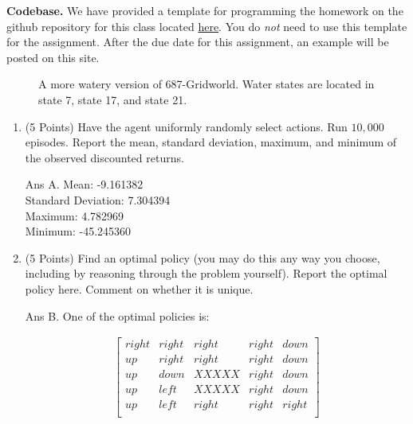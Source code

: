\documentclass[]{article}
\begin{document}
\textbf{Codebase.} We have provided a template for programming the homework on the github repository for this class located  \href{https://github.com/bmetevier/rl-framework-687-public}{here}. You do \emph{not} need to use this template for the assignment. After the due date for this assignment, an example will be posted on this site. 

\begin{figure}[h!!!]
    \caption{A more watery version of 687-Gridworld. Water states are located in state 7, state 17, and state 21.}
    \label{fig: watery gridworld}
\end{figure}

\begin{enumerate}[label=\Alph*]
    \item (5 Points) Have the agent uniformly randomly select actions. Run $10,\!000$ episodes. Report the mean, standard deviation, maximum, and minimum of the observed discounted returns. 

	{
		\color{blue}
			Ans A. Mean: -9.161382 \\
				Standard Deviation: 7.304394 \\
				Maximum: 4.782969 \\
				Minimum: -45.245360 \\
	}
    
    \item (5 Points) Find an optimal policy (you may do this any way you choose, including by reasoning through the problem yourself). Report the optimal policy here. Comment on whether it is unique.

	{
		\color{blue}
			Ans B. One of the optimal policies is:
	
		\begin{align}
		        \begin{bmatrix}
		        right&    right&    right&    right&     down     \\
		    up&    right&    right&    right&     down     \\
		    up&       down&       XXXXX&    right&     down     \\
		    up&       left&       XXXXX&    right&     down \\
		    up&       left&       right&    right&    right\\
		        \end{bmatrix}
	    \end{align}

}
\end{enumerate}
\end{document}
